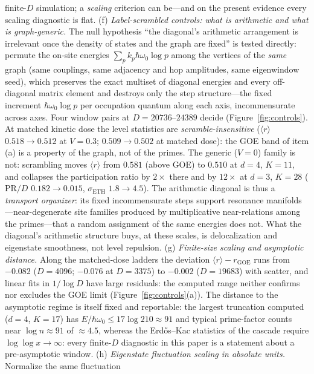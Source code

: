 \begin{remark}
finite-$D$ simulation; a \emph{scaling} criterion can be---and on the present evidence
every scaling diagnostic is flat.
(f) \emph{Label-scrambled controls: what is arithmetic and what is graph-generic.} The
null hypothesis ``the diagonal's arithmetic arrangement is irrelevant once the density of
states and the graph are fixed'' is tested directly: permute the on-site energies
$\sum_{p}k_{p}\hbar\omega_{0}\log p$ among the vertices of the \emph{same} graph (same
couplings, same adjacency and hop amplitudes, same eigenwindow seed), which preserves the
exact multiset of diagonal energies and every off-diagonal matrix element and destroys only
the step structure---the fixed increment $\hbar\omega_{0}\log p$ per occupation quantum
along each axis, incommensurate across axes. Four window pairs at $D=20736$--$24389$ decide
(Figure~\ref{fig:controls}). At matched kinetic dose the level statistics are
\emph{scramble-insensitive} ($\langle r\rangle$ $0.518\to0.512$ at $V=0.3$;
$0.509\to0.502$ at matched dose): the GOE band of item (a) is a property of the graph, not
of the primes. The generic ($V=0$) family is not: scrambling moves $\langle r\rangle$ from
$0.581$ (above GOE) to $0.510$ at $d=4$, $K=11$, and collapses the participation ratio by
$2\times$ there and by $12\times$ at $d=3$, $K=28$ ($\mathrm{PR}/D$ $0.182\to0.015$,
$\sigma_{\mathrm{ETH}}$ $1.8\to4.5$). The arithmetic diagonal is thus a \emph{transport
organizer}: its fixed incommensurate steps support resonance manifolds---near-degenerate
site families produced by multiplicative near-relations among the primes---that a random
assignment of the same energies does not. What the diagonal's arithmetic structure buys, at
these scales, is delocalization and eigenstate smoothness, not level repulsion.
(g) \emph{Finite-size scaling and asymptotic distance.} Along the matched-dose ladders the
deviation $\langle r\rangle-r_{\mathrm{GOE}}$ runs from $-0.082$ ($D=4096$; $-0.076$ at $D=3375$) to $-0.002$
($D=19683$) with scatter, and linear fits in $1/\log D$ have large residuals: the computed
range neither confirms nor excludes the GOE limit (Figure~\ref{fig:controls}(a)). The
distance to the asymptotic regime is itself fixed and reportable: the largest truncation
computed ($d=4$, $K=17$) has $E/\hbar\omega_{0}\leq17\log210\approx91$ and typical
prime-factor counts near $\log n\approx91$ of $\approx4.5$, whereas the
Erd\H{o}s--Kac statistics of the cascade require $\log\log x\to\infty$: every
finite-$D$ diagnostic in this paper is a statement about a pre-asymptotic window.
(h) \emph{Eigenstate fluctuation scaling in absolute units.} Normalize the same fluctuation

\end{remark}
